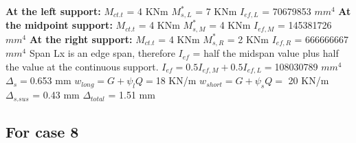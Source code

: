 \documentclass{article}%
\begin{document}
%
\newline%
\newline%
%
\textbf{At the left support:}%
\newline%
\newline%
%
$M_{ct.t}$ = 4 KNm%
\newline%
%
$M_{s,L}^{*}$ = 7 KNm%
\newline%
%
$I_{ef,L}$ = 70679853 $mm^{4}$%
\newline%
\newline%
%
\textbf{At the midpoint support:}%
\newline%
\newline%
%
$M_{ct.t}$ = 4 KNm%
\newline%
%
$M_{s,M}^{*}$ = 4 KNm%
\newline%
%
$I_{ef,M}$ = 145381726 $mm^{4}$%
\newline%
\newline%
%
\textbf{At the right support:}%
\newline%
\newline%
%
$M_{ct.t}$ = 4 KNm%
\newline%
%
$M_{s,R}^{*}$ = 2 KNm%
\newline%
%
$I_{ef,R}$ = 666666667 $mm^{4}$%
\newline%
\newline%
%
Span Lx is an edge span, therefore $I_{ef}$ = half the midspan value plus half the value at the continuous support.%
\newline%
\newline%
%
$I_{ef} = 0.5I_{ef,M} + 0.5I_{ef,L} = $108030789 $ mm^{4}$%
\newline%
\newline%
%
$\Delta_{s} =$0.653 mm%
\newline%
\newline%
%
$w_{long} = G + \psi_{l}Q = $18 KN/m%
\newline%
%
$w_{short} = G + \psi_{s}Q = $ 20 KN/m%
\newline%
\newline%
%
$\Delta_{s.sus}$ = 0.43 mm%
\newline%
\newline%
%
$\Delta_{total}$ = 1.51 mm%
\subsection*{For case 8}%
\label{subsec:Forcase8}%
\end{document}
